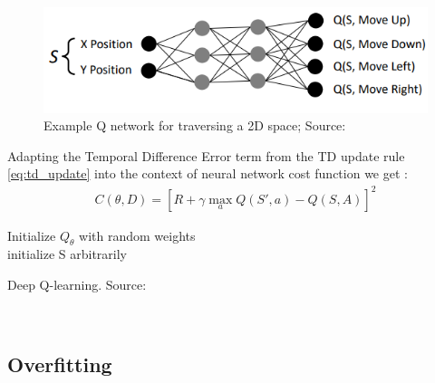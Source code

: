 \begin{figure}[H]
  \centering
  \includegraphics[scale=0.5]{figures/q_network.PNG}
  \caption{Example Q network for traversing a 2D space; Source: \cite{lecture_intro_to_deep_rl}}
  \label{fig:q_network}
\end{figure}

Adapting the Temporal Difference Error term from the TD update rule \ref{eq:td_update} into the context of neural network cost function we get \cite{lecture_intro_to_deep_rl}:
\begin{align}
    C(\theta, D) = [R + \gamma \max_a Q(S', a) - Q(S, A)]^2
\end{align}

\begin{algorithm}[H]
\SetAlgoLined
Initialize $Q_{\theta}$ with random weights \theta \; \\
initialize S arbitrarily\;\\
\caption{Deep Q-learning. Source: \cite{lecture_dqn} }
\end{algorithm}\\

\subsection{Overfitting}

